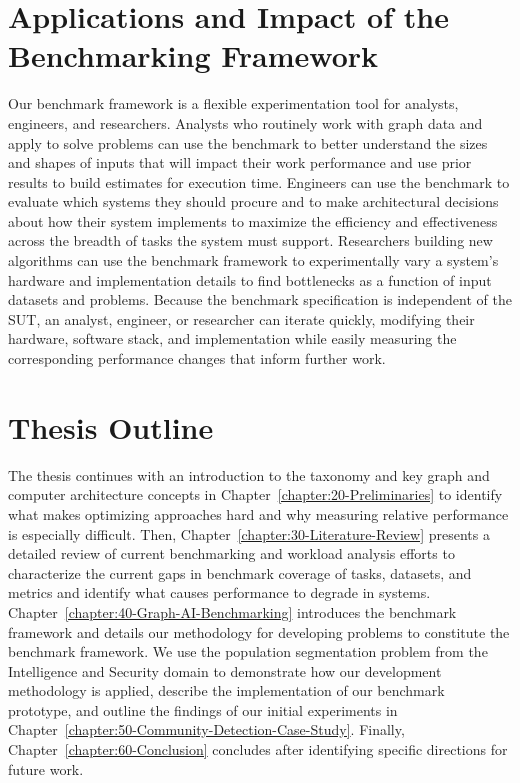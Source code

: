 \section{Applications and Impact of the \gai Benchmarking Framework}
Our \gai benchmark framework is a flexible experimentation tool for analysts, engineers, and researchers.
Analysts who routinely work with graph data and apply \gai to solve problems can use the \gai benchmark to better understand the sizes and shapes of inputs that will impact their work performance and use prior results to build estimates for \gai execution time. 
Engineers can use the \gai benchmark to evaluate which systems they should procure and to make architectural decisions about how their system implements \gai to maximize the efficiency and effectiveness across the breadth of tasks the system must support.
Researchers building new \gai algorithms can use the \gai benchmark framework to experimentally vary a \gai system's hardware and implementation details to find bottlenecks as a function of input datasets and problems. 
Because the benchmark specification is independent of the \ac{SUT}, an analyst, engineer, or researcher can iterate quickly, modifying their hardware, software stack, and implementation while easily measuring the corresponding performance changes that inform further work. 

\section{Thesis Outline}
\label{section:15-Thesis-Outline}
The thesis continues with an introduction to the \gai taxonomy and key graph and computer architecture concepts in Chapter~\ref{chapter:20-Preliminaries} to identify what makes optimizing \gai approaches hard and why measuring relative performance is especially difficult. 
Then, Chapter~\ref{chapter:30-Literature-Review} presents a detailed review of current \gai benchmarking and workload analysis efforts to characterize the current gaps in benchmark coverage of \gai tasks, datasets, and metrics and identify what causes performance to degrade in \gai systems. 
Chapter~\ref{chapter:40-Graph-AI-Benchmarking} introduces the \gai benchmark framework and details our methodology for developing \gai problems to constitute the benchmark framework. 
We use the population segmentation problem from the Intelligence and Security domain to demonstrate how our development methodology is applied, describe the implementation of our \gai benchmark prototype, and outline the findings of our initial experiments in Chapter~\ref{chapter:50-Community-Detection-Case-Study}.
Finally, Chapter~\ref{chapter:60-Conclusion} concludes after identifying specific directions for future work.